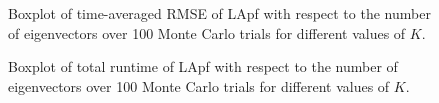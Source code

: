 \documentclass[10pt,letterpaper,final]{article}
\begin{document}
\begin{figure}
\centering
{}
\caption{Boxplot of time-averaged RMSE of LApf with respect to the number of eigenvectors over 100 Monte Carlo trials for different values of $K$.}
\label{fig:RMSE_NbEigen}
\end{figure}

\begin{figure}
\centering
{}
\caption{Boxplot of total runtime of LApf with respect to the number of eigenvectors over 100 Monte Carlo trials for different values of $K$.}
\label{fig:runtime_NbEigen}
\end{figure}
\end{document}
